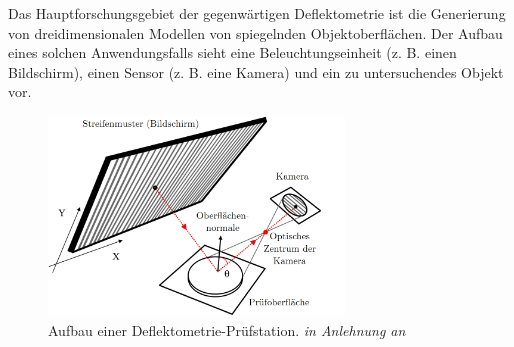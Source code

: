 Das Hauptforschungsgebiet der gegenwärtigen Deflektometrie ist die Generierung von dreidimensionalen Modellen von spiegelnden Objektoberflächen.
Der Aufbau eines solchen Anwendungsfalls sieht eine Beleuchtungseinheit (z. B. einen Bildschirm), einen Sensor (z. B. eine Kamera) und ein zu untersuchendes Objekt vor.

\begin{figure}[H]
	\centering
	\includegraphics[width=0.7\textwidth]{02_grundlagenDerDeflektometrie/rekonstruktion/figures/nature-articel-nr1}
	\caption[Aufbau einer Deflektometrie-Prüfstation]{Aufbau einer Deflektometrie-Prüfstation. \textit{in Anlehnung an} \cite{aufbau}}
	\label{img:aufbau}
\end{figure}

